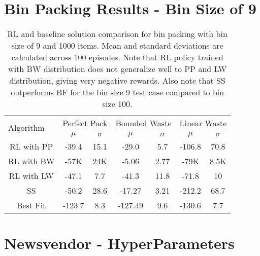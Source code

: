 \begin{appendices}
\section{Bin Packing Results - Bin Size of 9}
\label{appendix:bin_size_9}

\begin{table}[!htbp]
	\centering
		\begin{tabular}{|c|cc|cc|cc|}
			\hline
			\multicolumn{1}{|l|}{\multirow{2}{*}{Algorithm}}  & \multicolumn{2}{c|}{Perfect Pack} & \multicolumn{2}{c|}{Bounded Waste}	& \multicolumn{2}{c|}{Linear Waste} \\
			\multicolumn{1}{|l|}{} 											&   $\mu$            &        $\sigma$		& 	$\mu$    			& 	$\sigma$     		 &     $\mu$        &      $\sigma$          \\ \hline
			RL with PP  										  			   &  -39.4     		   &          15.1        	&  	-29.0 	  			  &   5.7	 				 &     -106.8       &      70.8     \\ \hline
			RL with BW  									  				  & -57K     		   &          24K        &  	-5.06 	  			  &   2.77	 				 &     -79K       &      8.5K     \\ \hline
			RL with LW 										 				  &  -47.1     		  &         7.7               &  	-41.3	  			&   11.8	 			   &     -71.8      &      10     \\ \hline
			SS  											   						&  -50.2     	    &         28.6           &    -17.27 	  			&   3.21	 			   &     -212.2      &      68.7     \\ \hline
			Best Fit  															  &  -123.7     	   &          8.3           &  	-127.49 	  			&   9.6	 			   &     -130.6     &      7.7     \\ \hline
		\end{tabular}
	\caption{RL and baseline solution comparison for bin packing with bin size of 9 and 1000 items. Mean and standard deviations are calculated across 100 episodes. Note that RL policy trained with BW distribution does not generalize well to PP and LW distribution, giving very negative rewards. Also note that SS outperforms BF for the bin size 9 test case compared to bin size 100.}
	\label{table:bin_size_9_RL_baseline_comp}
\end{table}

\clearpage

\section{Newsvendor - HyperParameters}
\label{appendix:newsvendor_hp}


\end{appendices}
